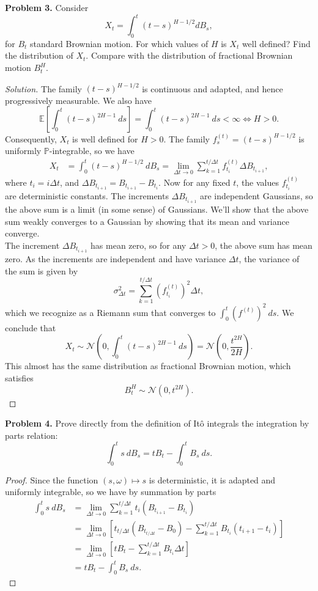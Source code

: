\documentclass[11pt,letterpaper]{report}
\newcommand{\mcal}[1]{\mathcal{#1}}
\newcommand{\E}{\mathbb{E}}
\newcommand{\Prob}{\mathbb{P}}
\newenvironment{solution}
{\begin{proof}[Solution]}
{\end{proof}}
\begin{document}
\noindent\textbf{Problem 3. }
Consider
\[
X_t = \int_0^t(t-s)^{H-1/2}dB_s,
\]
for $B_t$ standard Brownian motion. For which values of $H$ is $X_t$ well defined? Find the distribution of $X_t$. Compare with the distribution of fractional Brownian motion $B^H_t$.
\begin{solution}
	The family $(t-s)^{H-1/2}$ is continuous and adapted, and hence progressively measurable. We also have
	\[
	\E\left[\int_0^t(t-s)^{2H-1}\ ds\right] = \int_0^t(t-s)^{2H-1}\ ds < \infty \iff H>0.
	\]
	Consequently, $X_t$ is well defined for $H>0$. The family $f^{(t)}_s = (t-s)^{H-1/2}$ is uniformly $\Prob$-integrable, so we have
	\begin{align*}
	X_t &= \int_0^t(t-s)^{H-1/2}\ dB_s= \lim_{\Delta t\to 0}\sum_{k=1}^{t/\Delta t}f^{(t)}_{t_i}\Delta B_{t_{i+1}},
	\end{align*}
	where $t_i = i\Delta t$, and $\Delta B_{t_{i+1}} = B_{t_{i+1}}-B_{t_i}$. Now for any fixed $t$, the values $f^{(t)}_{t_i}$ are deterministic constants. The increments $\Delta B_{t_{i+1}}$ are independent Gaussians, so the above sum is a limit (in some sense) of Gaussians. We'll show that the above sum weakly converges to a Gaussian by showing that its mean and variance converge.\\

	\noindent The increment $\Delta B_{t_{i+1}}$ has mean zero, so for any $\Delta t>0$, the above sum has mean zero. As the increments are independent and have variance $\Delta t$, the variance of the sum is given by
	\[
	\sigma_{\Delta t}^2 = \sum_{k=1}^{t/\Delta t}\left(f_{t_i}^{(t)}\right)^2\Delta t,
	\]
	which we recognize as a Riemann sum that converges to $\int_0^t(f^{(t)})^2\ ds$. We conclude that
	\[
	X_t \sim \mcal{N}\left(0, \int_0^t(t-s)^{2H-1}\ ds\right) = \mcal{N}\left(0, \frac{t^{2H}}{2H}\right).
	\]
	This almost has the same distribution as fractional Brownian motion, which satisfies
	\[
	B^H_t\sim \mcal{N}(0, t^{2H}).
	\]
\end{solution}

\noindent\textbf{Problem 4. }
Prove directly from the definition of It\^o integrals the integration by parts relation:
\[
\int_0^ts\ dB_s = tB_t - \int_0^tB_s\ ds.
\]
\begin{proof}
	Since the function $(s, \omega)\mapsto s$ is deterministic, it is adapted and uniformly integrable, so we have by summation by parts
	\begin{align*}
		\int_0^t s\ dB_s&= \lim_{\Delta t\to 0}\sum_{k=1}^{t/\Delta t}t_i(B_{t_{i+1}}-B_{t_i})\\
		&= \lim_{\Delta t\to 0}\left[t_{t/\Delta t}(B_{t_{t/\Delta t}}-B_0) - \sum_{k=1}^{t/\Delta t}B_{t_i}(t_{i+1}-t_i)\right]\\
		&= \lim_{\Delta t\to 0}\left[tB_t - \sum_{k=1}^{t/\Delta t}B_{t_i}\Delta t\right]\\
		&= tB_t - \int_0^tB_s\ ds.
	\end{align*}
\end{proof}
\end{document}
